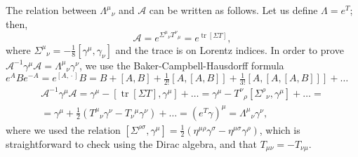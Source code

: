 \documentclass[a4paper,12pt]{book}
\DeclareMathOperator\tr{tr}
\theoremstyle{definition}
\theoremstyle{remark}
\let\oldcdot\cdot
\renewcommand{\cdot}{\! \oldcdot \!}
\begin{document}
The relation between $\Lambda^\mu{}_\nu$ and $\mathcal A$ can be written as follows. Let us define $\Lambda=e^T$; then,
\[\mathcal A=e^{\Sigma^\mu{}_\nu T^\nu{}_\mu}=e^{\tr[\Sigma T]},\]
where $\Sigma^\mu{}_\nu=-\frac{1}{8}[\gamma^\mu,\gamma_\nu]$ and the trace is on Lorentz indices. In order to prove $\mathcal A^{-1}\gamma^\mu\mathcal A=\Lambda^\mu{}_\nu\gamma^\nu$, we use the Baker-Campbell-Hausdorff formula $e^ABe^{-A}=e^{[A,\cdot]}B=B+[A,B]+\frac{1}{2!}[A,[A,B]]+\frac{1}{3!}[A,[A,[A,B]]]+\ldots$
\begin{multline*}
\mathcal A^{-1}\gamma^\mu\mathcal A=\gamma^\mu-[\tr[\Sigma T],\gamma^\mu]+\ldots=\gamma^\mu-T^\nu{}_\rho[\Sigma^\rho{}_\nu,\gamma^\mu]+\ldots=\\
=\gamma^\mu+\frac{1}{2}(T^\mu{}_\nu\gamma^\nu-T_\nu{}^\mu\gamma^\nu)+\ldots=(e^T\gamma)^\mu=\Lambda^\mu{}_\nu\gamma^\nu,
\end{multline*}
where we used the relation $[\Sigma^{\rho\sigma},\gamma^\mu]=\frac{1}{2}(\eta^{\mu\rho}\gamma^\sigma-\eta^{\mu\sigma}\gamma^\rho)$, which is straightforward to check using the Dirac algebra, and that $T_{\mu\nu}=-T_{\nu\mu}$.
\end{document}
